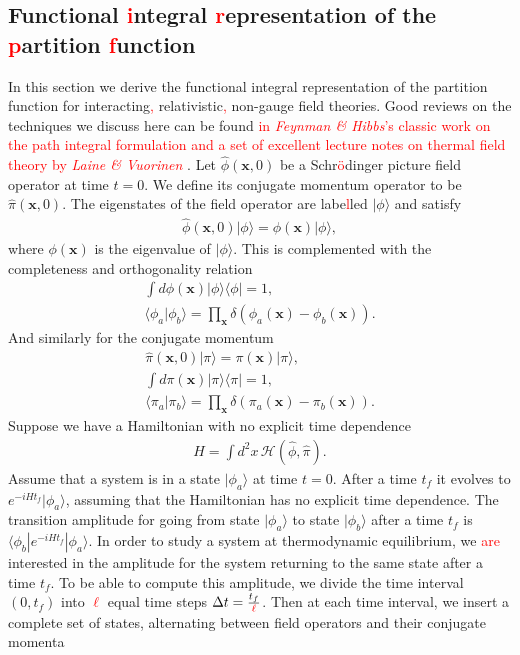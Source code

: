         \subsection{Functional \textcolor{red}{i}ntegral \textcolor{red}{r}epresentation of the \textcolor{red}{p}artition \textcolor{red}{f}unction} \label{Functional_Integral_sec}
        In this section we derive the functional integral representation of the partition function for interacting\textcolor{red}{,} relativistic\textcolor{red}{,} non-gauge field theories. Good reviews on the techniques we discuss here can be found \textcolor{red}{in \textit{Feynman \& Hibbs}'s classic work on the path integral formulation \cite{0486477223} and a set of excellent lecture notes on thermal field theory by \textit{Laine \& Vuorinen} \cite{Laine:2016hma}}.
        Let $\hat{\phi}(\bm{x},0)$ be a Schr\textcolor{red}{ö}dinger picture field operator at time $t=0$. We define its conjugate momentum operator to be $\hat{\pi}(\bm{x},0)$. The eigenstates of the field operator are labe\textcolor{red}{l}led $| \phi \rangle$ and satisfy
        \begin{align}
            \hat{\phi}(\bm{x},0) | \phi \rangle = \phi(\bm{x}) | \phi \rangle,
        \end{align}
        where $\phi(\bm{x})$ is the eigenvalue of $| \phi \rangle$. This is complemented with the completeness and orthogonality relation
        \begin{align}
            \int d \phi(\bm{x}) | \phi \rangle \langle \phi | = 1, \\
            \langle \phi_a | \phi_b \rangle = \prod_{\bm{x}} \delta(\phi_a(\bm{x}) - \phi_b(\bm{x})).
        \end{align}
        And similarly for the conjugate momentum
        \begin{align}
            \hat{\pi}(\bm{x},0) | \pi \rangle = \pi(\bm{x}) | \pi \rangle, \\
            \int d \pi(\bm{x}) | \pi \rangle \langle \pi | = 1, \\
            \langle \pi_a | \pi_b \rangle = \prod_{\bm{x}} \delta(\pi_a(\bm{x}) - \pi_b(\bm{x})).
        \end{align}
        Suppose we have a Hamiltonian with no explicit time dependence
        \begin{align}
            H = \int d^2x \, \mathcal{H}(\hat{\phi}, \hat{\pi}).
        \end{align}
        Assume that a system is in a state $| \phi_a \rangle$ at time $t=0$. After a time $t_f$ it evolves to $e^{-i H t_f} | \phi_a \rangle$, assuming that the Hamiltonian has no explicit time dependence. The transition amplitude for going from state $| \phi_a \rangle$ to state $| \phi_b \rangle$ after a time $t_f$ is $\langle \phi_b | e^{-i H t_f} | \phi_a \rangle$. In order to study a system at thermodynamic equilibrium, we \textcolor{red}{are} interested in the amplitude for the system returning to the same state after a time $t_f$. To be able to compute this amplitude, we divide the time interval $(0, t_f)$ into \textcolor{red}{$\ell$} equal time steps $\Delta t = \frac{t_f}{\textcolor{red}{\ell}}$. Then at each time interval, we insert a complete set of states, alternating between field operators and their conjugate momenta
